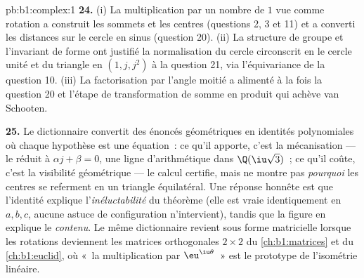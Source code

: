 \begin{solution}{pb:b1:complex:1}
\textbf{24.} (i) La multiplication par un nombre de  $1$ vue
comme rotation a construit les sommets et les centres (questions 2,
3 et 11) et a converti les distances sur le cercle en sinus
(question 20). (ii) La structure de groupe et l'invariant de forme
ont justifié la normalisation du cercle circonscrit en le cercle
unité et du triangle en $(1, j, j^2)$ à la question 21, via
l'équivariance de la question 10. (iii) La factorisation par
l'angle moitié a alimenté à la fois la question 20 et l'étape de
transformation de somme en produit qui achève van Schooten.

\textbf{25.} Le dictionnaire convertit des énoncés géométriques en
identités polynomiales où chaque hypothèse est une équation~: ce
qu'il apporte, c'est la mécanisation --- le 
réduit à $\alpha j + \beta = 0$, une ligne d'arithmétique dans
$\Q(\iu\sqrt3)$~; ce qu'il coûte, c'est la visibilité géométrique
--- le calcul certifie, mais ne montre pas \emph{pourquoi} les
centres se referment en un triangle équilatéral. Une réponse
honnête est que l'identité explique l'\emph{inéluctabilité} du
théorème (elle est vraie identiquement en $a, b, c$, aucune
astuce de configuration n'intervient), tandis que la figure en
explique le \emph{contenu}. Le même dictionnaire revient sous forme
matricielle lorsque les rotations deviennent les matrices
orthogonales $2 \times 2$ du \cref{ch:b1:matrices} et du
\cref{ch:b1:euclid}, où «~la multiplication par $\eu^{\iu\theta}$~»
est le prototype de l'isométrie linéaire.
\end{solution}
